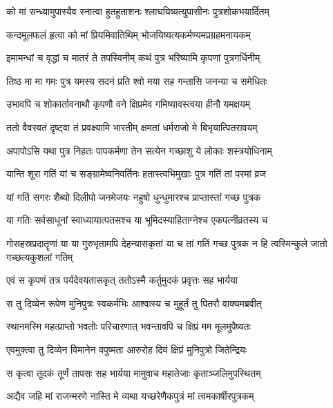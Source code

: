 \twolineshloka
{को मां सन्ध्यामुपास्यैव स्नात्वा हुतहुताशनः}
{श्लाघयिष्यत्युपासीनः पुत्रशोकभयार्दितम्} %

\twolineshloka
{कन्दमूलफलं हृत्वा को मां प्रियमिवातिथिम्}
{भोजयिष्यत्यकर्मण्यमप्रग्रहमनायकम्} %

\twolineshloka
{इमामन्धां च वृद्धां च मातरं ते तपस्विनीम्}
{कथं पुत्र भरिष्यामि कृपणां पुत्रगर्धिनीम्} %

\twolineshloka
{तिष्ठ मा मा गमः पुत्र यमस्य सदनं प्रति}
{श्वो मया सह गन्तासि जनन्या च समेधितः} %

\twolineshloka
{उभावपि च शोकार्तावनाथौ कृपणौ वने}
{क्षिप्रमेव गमिष्यावस्त्वया हीनौ यमक्षयम्} %

\twolineshloka
{ततो वैवस्वतं दृष्ट्वा तं प्रवक्ष्यामि भारतीम्}
{क्षमतां धर्मराजो मे बिभृयात्पितरावयम्} %

\twolineshloka
{अपापोऽसि यथा पुत्र निहतः पापकर्मणा}
{तेन सत्येन गच्छाशु ये लोकाः शस्त्रयोधिनाम्} %

\twolineshloka
{यान्ति शूरा गतिं यां च सङ्ग्रामेष्वनिवर्तिनः}
{हतास्त्वभिमुखाः पुत्र गतिं तां परमां व्रज} %

\twolineshloka
{यां गतिं सगरः शैब्यो दिलीपो जनमेजयः}
{नहुषो धुन्धुमारश्च प्राप्तास्तां गच्छ पुत्रक} %

\twolineshloka
{या गतिः सर्वसाधूनां स्वाध्यायात्पतसश्च या}
{भूमिदस्याहिताग्नेश्च एकपत्नीव्रतस्य च} %

\threelineshloka
{गोसहस्रप्रदातॄणां या या गुरुभृतामपि}
{देहन्यासकृतां या च तां गतिं गच्छ पुत्रक}
{न हि त्वस्मिन्कुले जातो गच्छत्यकुशलां गतिम्} %

\twolineshloka
{एवं स कृपणं तत्र पर्यदेवयतासकृत्}
{ततोऽस्मै कर्तुमुदकं प्रवृत्तः सह भार्यया} %

\twolineshloka
{स तु दिव्येन रूपेण मुनिपुत्रः स्वकर्मभिः}
{आश्वास्य च मुहूर्तं तु पितरौ वाक्यमब्रवीत्} %

\twolineshloka
{स्थानमस्मि महत्प्राप्तो भवतोः परिचारणात्}
{भवन्तावपि च क्षिप्रं मम मूलमुपैष्यतः} %

\twolineshloka
{एवमुक्त्वा तु दिव्येन विमानेन वपुष्मता}
{आरुरोह दिवं क्षिप्रं मुनिपुत्रो जितेन्द्रियः} %

\twolineshloka
{स कृत्वा तूदकं तूर्णं तापसः सह भार्यया}
{मामुवाच महातेजाः कृताञ्जलिमुपस्थितम्} %

\twolineshloka
{अद्यैव जहि मां राजन्मरणे नास्ति मे व्यथा}
{यच्छरेणैकपुत्रं मां त्वमकार्षीरपुत्रकम्} %

